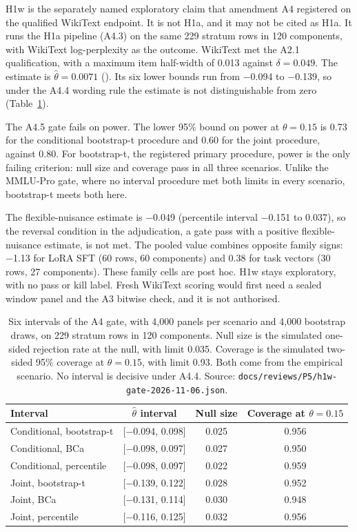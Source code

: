 H1w is the separately named exploratory claim that amendment A4 registered on the qualified WikiText endpoint. It is not H1a, and it may not be cited as H1a. It runs the H1a pipeline (A4.3) on the same 229 stratum rows in 120 components, with WikiText log-perplexity as the outcome. WikiText met the A2.1 qualification, with a maximum item half-width of 0.013 against $\delta = 0.049$. The estimate is $\hat\theta = 0.0071$ (). Its six lower bounds run from $-$0.094 to $-$0.139, so under the A4.4 wording rule the estimate is not distinguishable from zero (Table~\ref{tab:h1w}).

The A4.5 gate fails on power. The lower 95\% bound on power at $\theta = 0.15$ is 0.73 for the conditional bootstrap-t procedure and 0.60 for the joint procedure, against 0.80. For bootstrap-t, the registered primary procedure, power is the only failing criterion: null size and coverage pass in all three scenarios. Unlike the MMLU-Pro gate, where no interval procedure met both limits in every scenario, bootstrap-t meets both here.

The flexible-nuisance estimate is $-$0.049 (percentile interval $-$0.151 to 0.037), so the reversal condition in the adjudication, a gate pass with a positive flexible-nuisance estimate, is not met. The pooled value combines opposite family signs: $-$1.13 for LoRA SFT (60 rows, 60 components) and 0.38 for task vectors (30 rows, 27 components). These family cells are post hoc. H1w stays exploratory, with no pass or kill label. Fresh WikiText scoring would first need a sealed window panel and the A3 bitwise check, and it is not authorised.
\begin{table}[t]
\centering
\small
\setlength{\tabcolsep}{4pt}
\begin{tabular}{lccc}\toprule
Interval & $\hat\theta$ interval & Null size & Coverage at $\theta = 0.15$ \\\midrule
Conditional, bootstrap-t & [$-$0.094, 0.098] & 0.025 & 0.956 \\
Conditional, BCa & [$-$0.098, 0.097] & 0.027 & 0.950 \\
Conditional, percentile & [$-$0.098, 0.097] & 0.022 & 0.959 \\
Joint, bootstrap-t & [$-$0.139, 0.122] & 0.028 & 0.952 \\
Joint, BCa & [$-$0.131, 0.114] & 0.030 & 0.948 \\
Joint, percentile & [$-$0.116, 0.125] & 0.032 & 0.956 \\\bottomrule
\end{tabular}
\caption{Six intervals of the A4 gate, with 4,000 panels per scenario and 4,000 bootstrap draws, on 229 stratum rows in 120 components. Null size is the simulated one-sided rejection rate at the null, with limit 0.035. Coverage is the simulated two-sided 95\% coverage at $\theta = 0.15$, with limit 0.93. Both come from the empirical scenario. No interval is decisive under A4.4. Source: \texttt{docs/reviews/P5/h1w-gate-2026-11-06.json}.}
\label{tab:h1w}
\end{table}
\fussy
